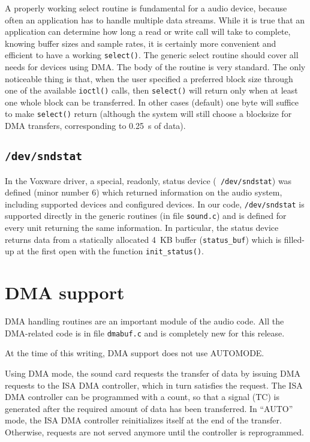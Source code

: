 \documentclass[11pt]{article}
\begin{document}
A properly working select routine is fundamental for a audio device,
because often an application has to handle multiple data streams.
While it is true that an application can determine how long
a read or write call will take to complete, knowing buffer sizes and
sample rates, it is certainly more convenient and efficient to have a 
working {\tt select()}. The generic select routine should cover all
needs for devices using DMA. The body of the routine is very
standard. The only noticeable thing is that, when the user specified a
preferred block size through one of the available {\tt ioctl()} calls,
then {\tt select()} will return only when at least one whole block
can be transferred. In other cases (default) one byte will suffice to
make {\tt select()} return (although the system will still choose a blocksize
for DMA transfers, corresponding to 0.25~s of data).

\subsection{{\tt /dev/sndstat}}

In the Voxware driver, a special, readonly, status device ({\tt
/dev/sndstat}) was defined (minor number 6) which returned information
on the audio system, including supported devices and configured
devices.  In our code, {\tt /dev/sndstat} is supported directly in
the generic routines (in file {\tt sound.c}) and is defined for
every unit returning the same information.  In particular, the
status device returns data from a statically allocated 4~KB buffer
({\tt status\_buf}) which is filled-up at the first open with the
function {\tt init\_status()}.

\section{DMA support}

DMA handling routines are an important module of the audio code.
All the DMA-related code is in file {\tt dmabuf.c} and is completely
new for this release.

At the time of this writing, DMA support does not use AUTOMODE.

Using DMA mode, the sound card requests the transfer of data by
issuing DMA requests to the ISA DMA controller, which in turn
satisfies the request. The ISA DMA controller can be programmed with a
count, so that a signal (TC) is generated after the required amount of data
has been transferred. In ``AUTO'' mode, the ISA DMA controller
reinitializes itself at the end of the transfer. Otherwise, requests
are not served anymore until the controller is reprogrammed.
\end{document}
